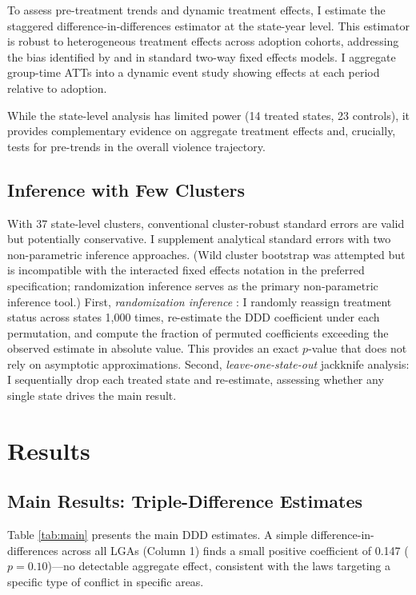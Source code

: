 \documentclass[12pt]{article}
\begin{document}
To assess pre-treatment trends and dynamic treatment effects, I estimate the \citet{callaway2021difference} staggered difference-in-differences estimator at the state-year level. This estimator is robust to heterogeneous treatment effects across adoption cohorts, addressing the bias identified by \citet{goodmanbacon2021difference} and \citet{dechaisemartin2020two} in standard two-way fixed effects models. I aggregate group-time ATTs into a dynamic event study showing effects at each period relative to adoption.

While the state-level analysis has limited power (14 treated states, 23 controls), it provides complementary evidence on aggregate treatment effects and, crucially, tests for pre-trends in the overall violence trajectory.

\subsection{Inference with Few Clusters}

With 37 state-level clusters, conventional cluster-robust standard errors are valid but potentially conservative. I supplement analytical standard errors with two non-parametric inference approaches. (Wild cluster bootstrap was attempted but is incompatible with the interacted fixed effects notation in the preferred specification; randomization inference serves as the primary non-parametric inference tool.) First, \textit{randomization inference} \citep{fisher1935design}: I randomly reassign treatment status across states 1,000 times, re-estimate the DDD coefficient under each permutation, and compute the fraction of permuted coefficients exceeding the observed estimate in absolute value. This provides an exact $p$-value that does not rely on asymptotic approximations. Second, \textit{leave-one-state-out} jackknife analysis: I sequentially drop each treated state and re-estimate, assessing whether any single state drives the main result.


\section{Results}

\subsection{Main Results: Triple-Difference Estimates}

Table \ref{tab:main} presents the main DDD estimates. A simple difference-in-differences across all LGAs (Column 1) finds a small positive coefficient of 0.147 ($p = 0.10$)---no detectable aggregate effect, consistent with the laws targeting a specific type of conflict in specific areas.
\end{document}
